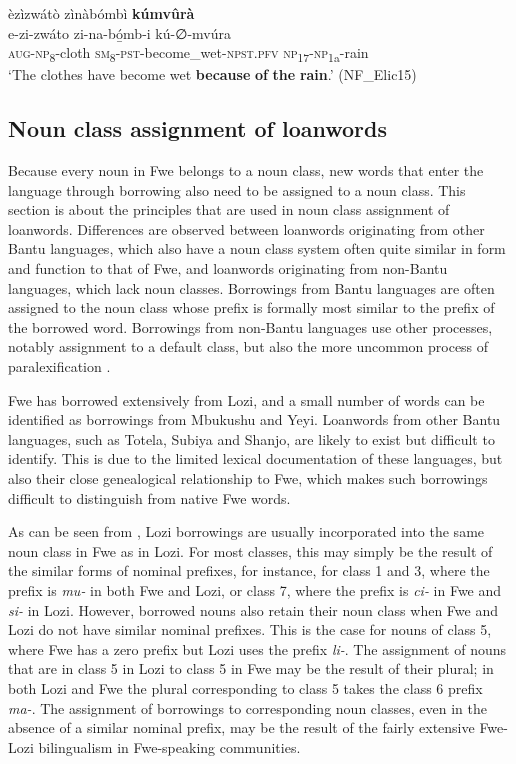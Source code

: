 \ea
\label{bkm:Ref498346503}
èzìzwátò zìnàbómbì \textbf{kúmvûrà}\\
\gll e-zi-zwáto    zi-na-bó̲mb-i      kú-∅-mvúra\\
\textsc{aug}-\textsc{np}\textsubscript{8}-cloth  \textsc{sm}\textsubscript{8}-\textsc{pst}-become\_wet-\textsc{npst}.\textsc{pfv}  \textsc{np}\textsubscript{17}-\textsc{np}\textsubscript{1a}-rain\\
\glt ‘The clothes have become wet \textbf{because} \textbf{of} \textbf{the} \textbf{rain}.’ (NF\_Elic15)
\z
\subsection{Noun class assignment of loanwords}\largerpage
\label{bkm:Ref452049199}\hypertarget{Toc75352641}{}
Because every noun in Fwe belongs to a noun class, new words that enter the language through borrowing also need to be assigned to a noun class. This section is about the principles that are used in noun class assignment of loanwords. Differences are observed between loanwords originating from other Bantu languages, which also have a noun class system often quite similar in form and function to that of Fwe, and loanwords originating from non-Bantu languages, which lack noun classes. Borrowings from Bantu languages are often assigned to the noun class whose prefix is formally most similar to the prefix of the borrowed word. Borrowings from non-Bantu languages use other processes, notably assignment to a default class, but also the more uncommon process of paralexification \citep{GunninkEtAl2015}.

Fwe has borrowed extensively from Lozi, and a small number of words can be identified as borrowings from Mbukushu and Yeyi. Loanwords from other Bantu languages, such as Totela, Subiya and Shanjo, are likely to exist but difficult to identify. This is due to the limited lexical documentation of these languages, but also their close genealogical relationship to Fwe, which makes such borrowings difficult to distinguish from native Fwe words.

As can be seen from , Lozi borrowings are usually incorporated into the same noun class in Fwe as in Lozi. For most classes, this may simply be the result of the similar forms of nominal prefixes, for instance, for class 1 and 3, where the prefix is \textit{mu-} in both Fwe and Lozi, or class 7, where the prefix is \textit{ci-} in Fwe and \textit{si-} in Lozi. However, borrowed nouns also retain their noun class when Fwe and Lozi do not have similar nominal prefixes. This is the case for nouns of class 5, where Fwe has a zero prefix but Lozi uses the prefix \textit{li-}. The assignment of nouns that are in class 5 in Lozi to class 5 in Fwe may be the result of their plural; in both Lozi and Fwe the plural corresponding to class 5 takes the class 6 prefix \textit{ma-}. The assignment of borrowings to corresponding noun classes, even in the absence of a similar nominal prefix, may be the result of the fairly extensive Fwe-Lozi bilingualism in Fwe-speaking communities.

